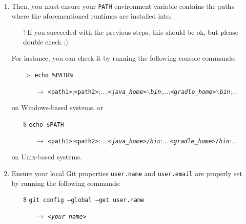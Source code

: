 \documentclass[handout]{beamer}\mode<presentation>{\usetheme{AMSCesenaPurpleAndGold}}
\begin{document}
\begin{frame}[allowframebreaks]
\begin{enumerate}
   \item Then, you must ensure your \texttt{PATH} environment variable contains the paths  where the aforementioned runtimes are installed into. 
	\begin{itemize}
		\item[!] If you succeeded with the previous steps, this should be ok, but please double check :)
	\end{itemize}
    \vspace{.5cm}
    For instance, you can check it by running the following console commands:
    \begin{itemize}
        \item[$>$] \texttt{echo \alert{\%}PATH\alert{\%}}
        \begin{itemize}
            \item[$\rightarrow$] \texttt{<path1>}\alert{;}\texttt{<path2>}\alert{;}$\ldots$\alert{;}\textit{\texttt{<java\_home>$\backslash$bin}}\alert{;}$\ldots$\alert{;}\textit{\texttt{<gradle\_home>$\backslash$bin}}\alert{;}$\ldots$
        \end{itemize}
    \end{itemize}
    on Windows-based systems, or
    \begin{itemize}
        \item[\$] \texttt{echo \alert{\$}PATH}
        \begin{itemize}
            \item[$\rightarrow$] \texttt{<path1>}\alert{:}\texttt{<path2>}\alert{:}$\ldots$\alert{:}\textit{\texttt{<java\_home>/bin}}\alert{:}$\ldots$\alert{:}\textit{\texttt{<gradle\_home>/bin}}\alert{:}$\ldots$
        \end{itemize}
    \end{itemize}
    on Unix-based systems.
    
    \framebreak
    
    \item Ensure your local Git properties \alert{\texttt{user.name}} and \alert{\texttt{user.email}} are properly set by running the following commands:
    \begin{itemize}	
    	\item[\$] \texttt{git config --global --get user.\alert{name}}
    	\begin{itemize}	
    		\item[$\rightarrow$] \texttt{\textit{<your name>}}    		
    	\end{itemize}
    	

\end{itemize}
\end{enumerate}
\end{frame}
\end{document}
